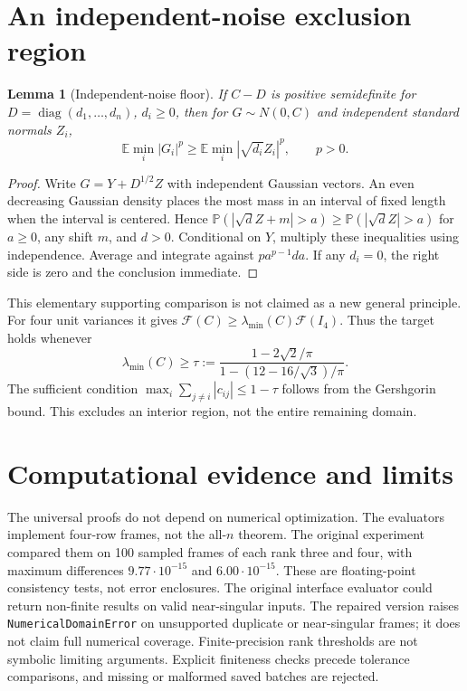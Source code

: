 \documentclass[11pt,a4paper]{article}
\newtheorem{lemma}[theorem]{Lemma}
\theoremstyle{remark}\newtheorem{remark}[theorem]{Remark}
\newcommand{\E}{\mathbb E}
\newcommand{\Prb}{\mathbb P}
\newcommand{\F}{\mathcal F}
\newcommand{\diag}{\operatorname{diag}}
\begin{document}
\section{An independent-noise exclusion region}\label{sec:noise}
\begin{lemma}[Independent-noise floor]
If $C-D$ is positive semidefinite for $D=\diag(d_1,\ldots,d_n)$, $d_i\ge0$, then for $G\sim N(0,C)$ and independent standard normals $Z_i$,
\[
 \E\min_i|G_i|^p\ge\E\min_i|\sqrt{d_i}Z_i|^p,\qquad p>0.
\]
\end{lemma}
\begin{proof}
Write $G=Y+D^{1/2}Z$ with independent Gaussian vectors. An even decreasing Gaussian density places the most mass in an interval of fixed length when the interval is centered. Hence
$\Prb(|\sqrt dZ+m|>a)\ge\Prb(|\sqrt dZ|>a)$
for $a\ge0$, any shift $m$, and $d>0$. Conditional on $Y$, multiply these inequalities using independence. Average and integrate against $pa^{p-1}da$. If any $d_i=0$, the right side is zero and the conclusion immediate.
\end{proof}
This elementary supporting comparison is not claimed as a new general principle. For four unit variances it gives $\F(C)\ge\lambda_{\min}(C)\F(I_4)$. Thus the target holds whenever
\[
 \lambda_{\min}(C)\ge
 \tau:=\frac{1-2\sqrt2/\pi}{1-(12-16/\sqrt3)/\pi}.
\]
The sufficient condition $\max_i\sum_{j\ne i}|c_{ij}|\le1-\tau$ follows from the Gershgorin bound. This excludes an interior region, not the entire remaining domain.

\section{Computational evidence and limits}
The universal proofs do not depend on numerical optimization. The evaluators implement four-row frames, not the all-$n$ theorem. The original experiment compared them on 100 sampled frames of each rank three and four, with maximum differences $9.77\cdot10^{-15}$ and $6.00\cdot10^{-15}$. These are floating-point consistency tests, not error enclosures. The original interface evaluator could return non-finite results on valid near-singular inputs. The repaired version raises \texttt{NumericalDomainError} on unsupported duplicate or near-singular frames; it does not claim full numerical coverage. Finite-precision rank thresholds are not symbolic limiting arguments. Explicit finiteness checks precede tolerance comparisons, and missing or malformed saved batches are rejected.
\end{document}
